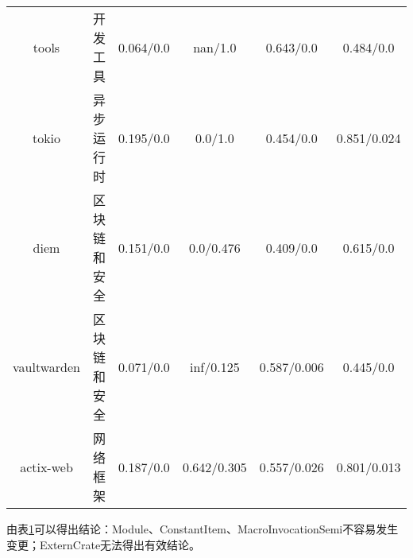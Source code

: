 \begin{table}[ht]
\begin{tabular}{cccccc}
		tools       & 开发工具 & \cellcolor{orange!30}0.064/0.0 & \cellcolor{gray!20}nan/1.0     & \cellcolor{orange!30}0.643/0.0    & \cellcolor{orange!30}0.484/0.0           \\
		tokio       & 异步运行时       & \cellcolor{orange!30}0.195/0.0 & \cellcolor{gray!20}0.0/1.0     & \cellcolor{orange!30}0.454/0.0    & \cellcolor{orange!30}0.851/0.024         \\
		diem        & 区块链和安全      & \cellcolor{orange!30}0.151/0.0 & \cellcolor{gray!20}0.0/0.476   & \cellcolor{orange!30}0.409/0.0    & \cellcolor{orange!30}0.615/0.0           \\
		vaultwarden & 区块链和安全      & \cellcolor{orange!30}0.071/0.0 & \cellcolor{gray!20}inf/0.125   & \cellcolor{orange!30}0.587/0.006  & \cellcolor{orange!30}0.445/0.0           \\
		actix-web   & 网络框架        & \cellcolor{orange!30}0.187/0.0 & \cellcolor{gray!20}0.642/0.305 & \cellcolor{orange!30}0.557/0.026  & \cellcolor{orange!30}0.801/0.013   \\
        \bottomrule
	\end{tabular}
	\label{tab:RQ1-1}
\end{table}

由表\ref{tab:RQ1-1}可以得出结论：Module、ConstantItem、MacroInvocationSemi不容易发生变更；ExternCrate无法得出有效结论。

